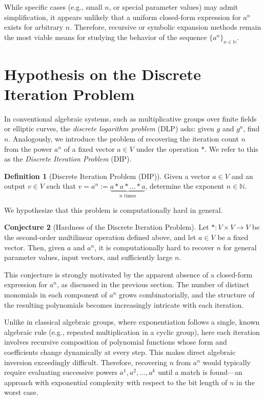 \documentclass[12pt]{article}
\theoremstyle{definition}
\newtheorem{definition}{Definition}[section]
\newtheorem{conjecture}[definition]{Conjecture}
\theoremstyle{plain}
\theoremstyle{remark}
\begin{document}
While specific cases (e.g., small \( n \), or special parameter values) may admit simplification, it appears unlikely that a uniform closed-form expression for \( a^n \) exists for arbitrary \( n \). Therefore, recursive or symbolic expansion methods remain the most viable means for studying the behavior of the sequence \( \{a^n\}_{n \in \mathbb{N}} \).

\section{Hypothesis on the Discrete Iteration Problem}

In conventional algebraic systems, such as multiplicative groups over finite fields or elliptic curves, the \emph{discrete logarithm problem} (DLP) asks: given \( g \) and \( g^n \), find \( n \). Analogously, we introduce the problem of recovering the iteration count \( n \) from the power \( a^n \) of a fixed vector \( a \in V \) under the operation \( * \). We refer to this as the \emph{Discrete Iteration Problem} (DIP).

\begin{definition}[Discrete Iteration Problem (DIP)]
Given a vector \( a \in V \) and an output \( v \in V \) such that \( v = a^n := \underbrace{a * a * \dots * a}_{n \text{ times}} \), determine the exponent \( n \in \mathbb{N} \).
\end{definition}

We hypothesize that this problem is computationally hard in general.

\begin{conjecture}[Hardness of the Discrete Iteration Problem]
Let \( * : V \times V \to V \) be the second-order multilinear operation defined above, and let \( a \in V \) be a fixed vector. Then, given \( a \) and \( a^n \), it is computationally hard to recover \( n \) for general parameter values, input vectors, and sufficiently large \( n \).
\end{conjecture}

This conjecture is strongly motivated by the apparent absence of a closed-form expression for \( a^n \), as discussed in the previous section. The number of distinct monomials in each component of \( a^n \) grows combinatorially, and the structure of the resulting polynomials becomes increasingly intricate with each iteration.

Unlike in classical algebraic groups, where exponentiation follows a single, known algebraic rule (e.g., repeated multiplication in a cyclic group), here each iteration involves recursive composition of polynomial functions whose form and coefficients change dynamically at every step. This makes direct algebraic inversion exceedingly difficult. Therefore, recovering \( n \) from \( a^n \) would typically require evaluating successive powers \( a^1, a^2, \dots, a^k \) until a match is found—an approach with exponential complexity with respect to the bit length of \( n \) in the worst case.
\end{document}
